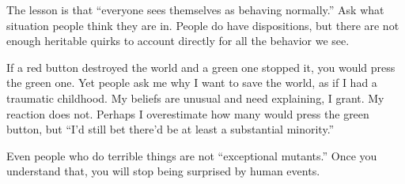 The lesson is that ``everyone sees themselves as behaving normally.'' Ask what situation people think they are in. People do have dispositions, but there are not enough heritable quirks to account directly for all the behavior we see.

If a red button destroyed the world and a green one stopped it, you would press the green one. Yet people ask me why I want to save the world, as if I had a traumatic childhood. My beliefs are unusual and need explaining, I grant. My reaction does not. Perhaps I overestimate how many would press the green button, but ``I'd still bet there'd be at least a substantial minority.''

Even people who do terrible things are not ``exceptional mutants.'' Once you understand that, you will stop being surprised by human events. 
